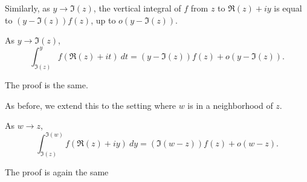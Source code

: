 
Similarly, as $y \to \Im(z)$, the vertical integral of $f$ from $z$ to $\Re(z)+iy$ is equal to
$(y - \Im(z)) f(z)$, up to $o(y - \Im(z))$.
\begin{lemma}
  \label{deriv_of_wedgeInt_im'}
  \leanok
  As $y \to \Im(z)$,
  $$
    \int_{\Im(z)}^y f(\Re(z)+it)\ dt
    =
    (y-\Im(z)) f(z)
    +
    o(y-\Im(z))
    .
  $$
\end{lemma}
The proof is the same.



As before, we extend this to the setting where $w$ is in a neighborhood of $z$.
\begin{lemma}
  \label{deriv_of_wedgeInt_im''}
  \leanok
  As $w \to z$,
  $$
    \int_{\Im(z)}^{\Im(w)} f(\Re(z)+iy)\ dy
    =
    (\Im(w-z)) f(z)
    +
    o(w-z)
    .
  $$
\end{lemma}
The proof is again the same


